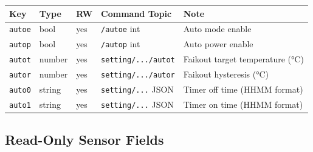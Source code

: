 \documentclass[11pt,a4paper]{article}
\newcommand{\field}[1]{\texttt{\color{codegreen}#1}}
\begin{document}
\begin{tabularx}{\textwidth}{@{}llllX@{}}
\toprule
\textbf{Key} & \textbf{Type} & \textbf{RW} & \textbf{Command Topic} & \textbf{Note} \\
\midrule
\rowcolor{lightbg}
\field{autoe}  & bool   & yes & \texttt{/autoe} int             & Auto mode enable \\
\field{autop}  & bool   & yes & \texttt{/autop} int             & Auto power enable \\
\rowcolor{lightbg}
\field{autot}  & number & yes & \texttt{setting/.../autot}      & Faikout target temperature (°C) \\
\field{autor}  & number & yes & \texttt{setting/.../autor}      & Faikout hysteresis (°C) \\
\rowcolor{lightbg}
\field{auto0}  & string & yes & \texttt{setting/...} JSON       & Timer off time (HHMM format) \\
\field{auto1}  & string & yes & \texttt{setting/...} JSON       & Timer on time (HHMM format) \\
\bottomrule
\end{tabularx}

\subsection{Read-Only Sensor Fields}
\end{document}
